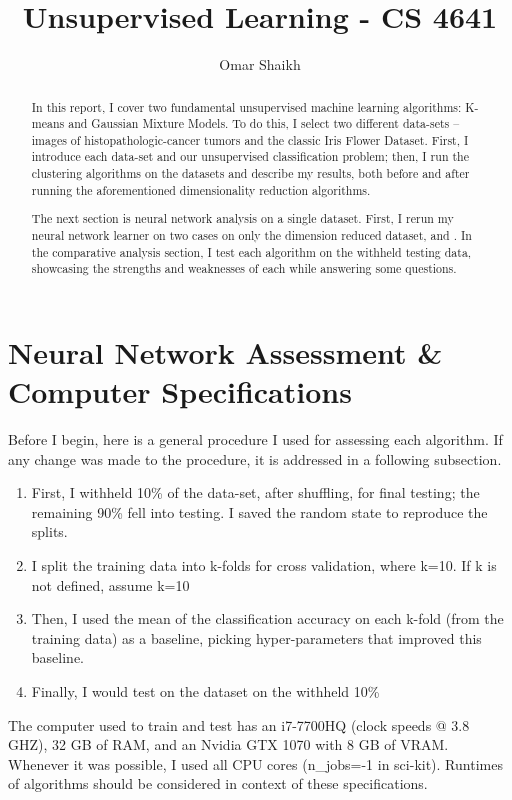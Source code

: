 \documentclass[a4paper]{article}
\begin{document}
\title{Unsupervised Learning - CS 4641}
\author{Omar Shaikh}
\maketitle

\begin{abstract}
    In this report, I cover two fundamental unsupervised machine learning algorithms: K-means and Gaussian Mixture Models. To do this, I select two different data-sets -- images of histopathologic-cancer tumors and the classic Iris Flower Dataset. First, I introduce each data-set and our unsupervised classification problem; then, I run the clustering algorithms on the datasets and describe my results, both before and after running the aforementioned dimensionality reduction algorithms. 
    
    The next section is neural network analysis on a single dataset. First, I rerun my neural network learner on two cases on only the dimension reduced dataset, and . In the comparative analysis section, I test each algorithm on the withheld testing data, showcasing the strengths and weaknesses of each while answering some questions.
\end{abstract}

\section{Neural Network Assessment \& Computer Specifications}
Before I begin, here is a general procedure I used for assessing each algorithm. If any change was made to the procedure, it is addressed in a following subsection.

\begin{enumerate}
  \item First, I withheld 10\% of the data-set, after shuffling, for final testing; the remaining 90\% fell into testing. I saved the random state to reproduce the splits.
  \item I split the training data into k-folds for cross validation, where k=10. If k is not defined, assume k=10
  \item Then, I used the mean of the classification accuracy on each k-fold (from the training data) as a baseline, picking hyper-parameters that improved this baseline.
  \item Finally, I would test on the dataset on the withheld 10\% 
\end{enumerate}
The computer used to train and test has an i7-7700HQ (clock speeds @ 3.8 GHZ), 32 GB of RAM, and an Nvidia GTX 1070 with 8 GB of VRAM. Whenever it was possible, I used all CPU cores (n\_jobs=-1 in sci-kit). Runtimes of algorithms should be considered in context of these specifications.
\end{document}
